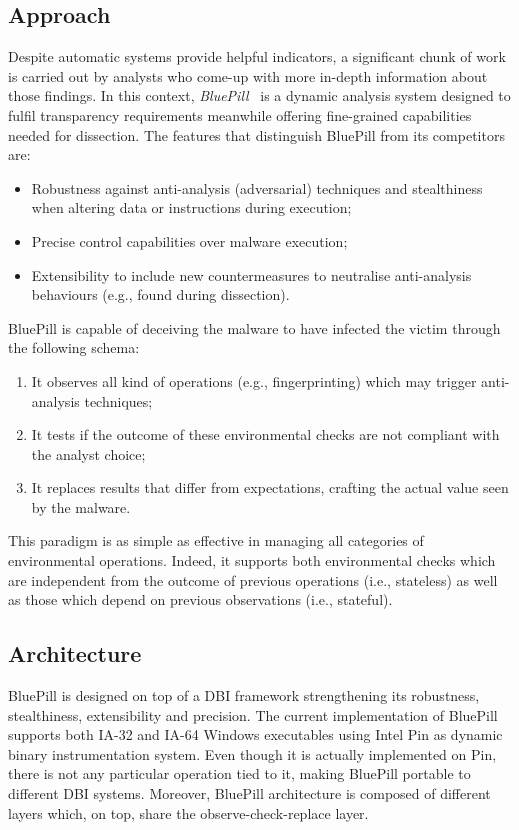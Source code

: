 \documentclass[LaM,binding=0.6cm]{sapthesis}
\begin{document}
\subsection{Approach}
Despite automatic systems provide helpful indicators, a significant chunk of work is carried out by analysts who come-up with more in-depth information about those findings. In this context, \textit{BluePill}~\cite{bho} is a dynamic analysis system designed to fulfil transparency requirements meanwhile offering fine-grained capabilities needed for dissection. The features that distinguish BluePill from its competitors are:
\begin{itemize}
\item Robustness against anti-analysis (adversarial) techniques and stealthiness when altering data or instructions during execution;
\item Precise control capabilities over malware execution;
\item Extensibility to include new countermeasures to neutralise anti-analysis behaviours (e.g., found during dissection).
\end{itemize}
\newpage
\noindent
BluePill is capable of deceiving the malware to have infected the victim through the following schema:
\begin{enumerate}
\item It observes all kind of operations (e.g., fingerprinting) which may trigger anti-analysis techniques;
\item It tests if the outcome of these environmental checks are not compliant with the analyst choice;
\item It replaces results that differ from expectations, crafting the actual value seen by the malware.  
\end{enumerate}
This paradigm is as simple as effective in managing all categories of environmental operations. Indeed, it supports both environmental checks which are independent from the outcome of previous operations (i.e., stateless) as well as those which depend on previous observations (i.e., stateful).

\subsection{Architecture}
BluePill is designed on top of a DBI framework strengthening its robustness, stealthiness, extensibility and precision. The current implementation of BluePill supports both IA-32 and IA-64 Windows executables using Intel Pin as dynamic binary instrumentation system. Even though it is actually implemented on Pin, there is not any particular operation tied to it, making BluePill portable to different DBI systems. Moreover, BluePill architecture is composed of different layers which, on top, share the observe-check-replace layer.
\end{document}
